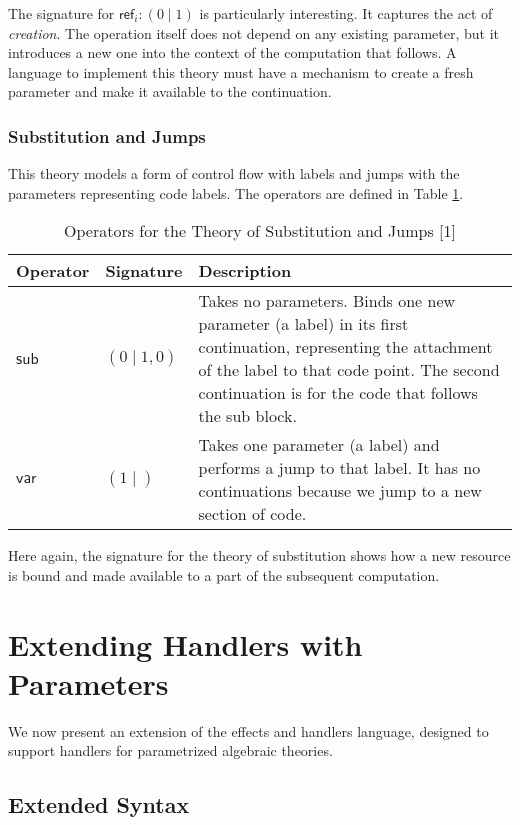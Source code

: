 \documentclass{article}
\theoremstyle{definition}
\theoremstyle{remark}
\newcommand\newref{\mathsf{ref}}
\newcommand\sub{\mathsf{sub}}
\newcommand\var{\mathsf{var}}
\begin{document}
The signature for $\newref_i: (0\mid 1)$ is particularly interesting.
It captures the act of \emph{creation}. The operation itself does not depend on any existing parameter, but it introduces a new one into the context of the computation that follows.
A language to implement this theory must have a mechanism to create a fresh parameter and make it available to the continuation.

\subsubsection{Substitution and Jumps}

This theory models a form of control flow with labels and jumps with the parameters representing code labels. The operators are defined in Table \ref{tab:subst}.

\begin{table}[h!]
  \centering
  \begin{tabular}{l l p{8cm}}
    \hline
    \textbf{Operator} & \textbf{Signature} & \textbf{Description} \\
    \hline
    $\sub$ & $(0\mid 1,0)$ & Takes no parameters. Binds one new parameter (a label) in its first continuation, representing the attachment of the label to that code point.
    The second continuation is for the code that follows the sub block. \\
    $\var$ & $(1\mid )$    & Takes one parameter (a label) and performs a jump to that label. It has no continuations because we jump to a new section of code. \\
    \hline
  \end{tabular}
  \caption{Operators for the Theory of Substitution and Jumps [1]}
  \label{tab:subst}
\end{table}

Here again, the signature for the theory of substitution shows how a new resource is bound and made available to a part of the subsequent computation.

\section{Extending Handlers with Parameters}

We now present an extension of the effects and handlers language, designed to support handlers for parametrized algebraic theories.

\subsection{Extended Syntax}
\end{document}
